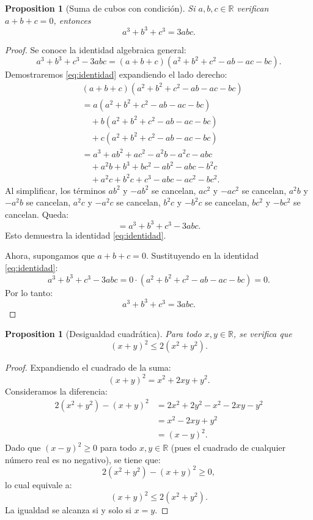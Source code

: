 \documentclass[11pt,a4paper]{article}
\theoremstyle{plain}
\newtheorem{proposition}[theorem]{Proposition}
\theoremstyle{definition}
\begin{document}
\bigskip

\begin{proposition}[Suma de cubos con condición]
Si $a, b, c \in \mathbb{R}$ verifican $a + b + c = 0$, entonces
\[
a^3 + b^3 + c^3 = 3abc.
\]
\end{proposition}

\begin{proof}
Se conoce la identidad algebraica general:
\begin{equation}\label{eq:identidad}
a^3 + b^3 + c^3 - 3abc = (a + b + c)(a^2 + b^2 + c^2 - ab - ac - bc).
\end{equation}
Demostraremos \eqref{eq:identidad} expandiendo el lado derecho:
\begin{align*}
&(a + b + c)(a^2 + b^2 + c^2 - ab - ac - bc) \\
&= a(a^2 + b^2 + c^2 - ab - ac - bc) \\
&\quad + b(a^2 + b^2 + c^2 - ab - ac - bc) \\
&\quad + c(a^2 + b^2 + c^2 - ab - ac - bc) \\
&= a^3 + ab^2 + ac^2 - a^2b - a^2c - abc \\
&\quad + a^2b + b^3 + bc^2 - ab^2 - abc - b^2c \\
&\quad + a^2c + b^2c + c^3 - abc - ac^2 - bc^2.
\end{align*}
Al simplificar, los términos $ab^2$ y $-ab^2$ se cancelan, $ac^2$ y $-ac^2$ se cancelan, $a^2b$ y $-a^2b$ se cancelan, $a^2c$ y $-a^2c$ se cancelan, $b^2c$ y $-b^2c$ se cancelan, $bc^2$ y $-bc^2$ se cancelan. Queda:
\[
= a^3 + b^3 + c^3 - 3abc.
\]
Esto demuestra la identidad \eqref{eq:identidad}.

Ahora, supongamos que $a + b + c = 0$. Sustituyendo en la identidad \eqref{eq:identidad}:
\[
a^3 + b^3 + c^3 - 3abc = 0 \cdot (a^2 + b^2 + c^2 - ab - ac - bc) = 0.
\]
Por lo tanto:
\[
a^3 + b^3 + c^3 = 3abc.
\]
\end{proof}

\bigskip

\begin{proposition}[Desigualdad cuadrática]
Para todo $x, y \in \mathbb{R}$, se verifica que
\[
(x + y)^2 \leq 2(x^2 + y^2).
\]
\end{proposition}

\begin{proof}
Expandiendo el cuadrado de la suma:
\[
(x + y)^2 = x^2 + 2xy + y^2.
\]
Consideramos la diferencia:
\begin{align*}
2(x^2 + y^2) - (x + y)^2 &= 2x^2 + 2y^2 - x^2 - 2xy - y^2 \\
                          &= x^2 - 2xy + y^2 \\
                          &= (x - y)^2.
\end{align*}
Dado que $(x - y)^2 \geq 0$ para todo $x, y \in \mathbb{R}$ (pues el cuadrado de cualquier número real es no negativo), se tiene que:
\[
2(x^2 + y^2) - (x + y)^2 \geq 0,
\]
lo cual equivale a:
\[
(x + y)^2 \leq 2(x^2 + y^2).
\]
La igualdad se alcanza si y solo si $x = y$.
\end{proof}
\end{document}
